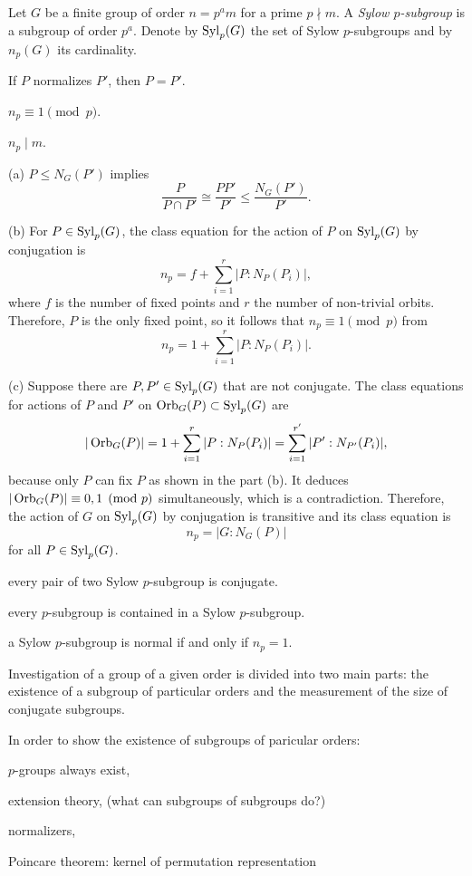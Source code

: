 \documentclass{../note}
\begin{document}
\begin{prb}
Let $G$ be a finite group of order $n=p^am$ for a prime $p\nmid m$.
A \emph{Sylow $p$-subgroup} is a subgroup of order $p^a$.
Denote by $\operatorname{Syl}_p(G)$ the set of Sylow $p$-subgroups and by $n_p(G)$ its cardinality.
\begin{parts}
\item If $P$ normalizes $P'$, then $P=P'$.
\item $n_p\equiv1\pmod p$.
\item $n_p\mid m$.
\end{parts}
\end{prb}
\begin{pf}
(a)
$P\le N_G(P')$ implies
\[\frac P{P\cap P'}\cong\frac{PP'}{P'}\le\frac{N_G(P')}{P'}.\]


(b)
For $P\in\operatorname{Syl}_p(G)$, the class equation for the action of $P$ on $\operatorname{Syl}_p(G)$ by conjugation is
\[n_p=f+\sum_{i=1}^r|P:N_P(P_i)|,\]
where $f$ is the number of fixed points and $r$ the number of non-trivial orbits.
Therefore, $P$ is the only fixed point, so it follows that $n_p\equiv1\pmod p$ from
\[n_p=1+\sum_{i=1}^r|P:N_P(P_i)|.\]

(c)
Suppose there are $P,P'\in\operatorname{Syl}_p(G)$ that are not conjugate.
The class equations for actions of $P$ and $P'$ on $\operatorname{Orb}_G(P)\subset\operatorname{Syl}_p(G)$ are
\[|\operatorname{Orb}_G(P)|=1+\sum_{i=1}^r|P:N_P(P_i)|=\sum_{i=1}^{r'}|P':N_{P'}(P_i)|,\]
because only $P$ can fix $P$ as shown in the part (b).
It deduces $|\operatorname{Orb}_G(P)|\equiv0,1\pmod{p}$ simultaneously, which is a contradiction.
Therefore, the action of $G$ on $\operatorname{Syl}_p(G)$ by conjugation is transitive and its class equation is
\[n_p=|G:N_G(P)|\]
for all $P\in\operatorname{Syl}_p(G)$.
\end{pf}

\begin{parts}
\item every pair of two Sylow $p$-subgroup is conjugate.
\item every $p$-subgroup is contained in a Sylow $p$-subgroup.
\item a Sylow $p$-subgroup is normal if and only if $n_p=1$.
\end{parts}

Investigation of a group of a given order is divided into two main parts: the existence of a subgroup of particular orders and the measurement of the size of conjugate subgroups.

In order to show the existence of subgroups of paricular orders:
\begin{parts}
\item $p$-groups always exist,
\item extension theory, (what can subgroups of subgroups do?)
\item normalizers,
\item Poincare theorem: kernel of permutation representation
\end{parts}
\end{document}
